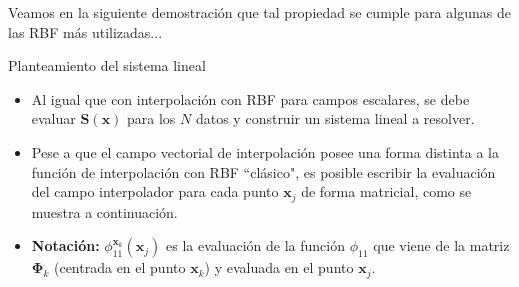 \documentclass{beamer}
\begin{document}
\begin{frame}
  \begin{example}
    Veamos en la siguiente demostración que tal propiedad se cumple para algunas de las RBF más utilizadas...
  \end{example}


\end{frame}

\begin{frame}{Planteamiento del sistema lineal}
  \begin{itemize}
  \item Al igual que con interpolación con RBF para campos escalares, se debe evaluar $\mathbf{S}(\mathbf{x})$ para los $N$ datos
  y construir un sistema lineal a resolver.
  \item Pese a que el campo vectorial de interpolación posee una forma distinta a la función de interpolación con RBF ``clásico", es posible
  escribir la evaluación del campo interpolador para cada punto $\mathbf{x}_j$ de forma matricial, como se muestra a continuación.
  \item \textbf{Notación:} $\phi_{11}^{\mathbf{x}_k}(\mathbf{x}_j)$ es la evaluación de la función $\phi_{11}$ que viene de la matriz
  $\mathbf{\Phi}_{k}$ (centrada en el punto $\mathbf{x}_k$) y evaluada en el punto $\mathbf{x}_j$.
\end{itemize}  
\end{frame}
\end{document}
